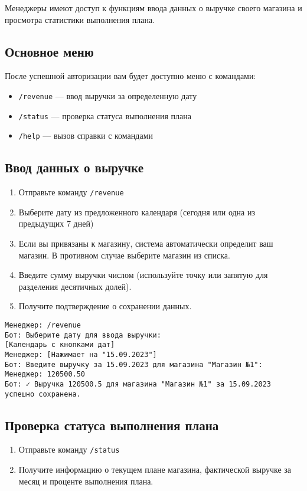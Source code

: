 \documentclass[a4paper,12pt]{article}
\begin{document}
Менеджеры имеют доступ к функциям ввода данных о выручке своего магазина и просмотра статистики выполнения плана.

\subsection{Основное меню}
После успешной авторизации вам будет доступно меню с командами:
\begin{itemize}
    \item \texttt{/revenue} — ввод выручки за определенную дату
    \item \texttt{/status} — проверка статуса выполнения плана
    \item \texttt{/help} — вызов справки с командами
\end{itemize}

\subsection{Ввод данных о выручке}
\begin{enumerate}
    \item Отправьте команду \texttt{/revenue}
    \item Выберите дату из предложенного календаря (сегодня или одна из предыдущих 7 дней)
    \item Если вы привязаны к магазину, система автоматически определит ваш магазин. В противном случае выберите магазин из списка.
    \item Введите сумму выручки числом (используйте точку или запятую для разделения десятичных долей).
    \item Получите подтверждение о сохранении данных.
\end{enumerate}

\begin{tcolorbox}[colback=blue!5, title=Пример ввода выручки]
\begin{verbatim}
Менеджер: /revenue
Бот: Выберите дату для ввода выручки:
[Календарь с кнопками дат]
Менеджер: [Нажимает на "15.09.2023"]
Бот: Введите выручку за 15.09.2023 для магазина "Магазин №1":
Менеджер: 120500.50
Бот: ✓ Выручка 120500.5 для магазина "Магазин №1" за 15.09.2023 успешно сохранена.
\end{verbatim}
\end{tcolorbox}

\subsection{Проверка статуса выполнения плана}
\begin{enumerate}
    \item Отправьте команду \texttt{/status}
    \item Получите информацию о текущем плане магазина, фактической выручке за месяц и проценте выполнения плана.
\end{enumerate}
\end{document}
